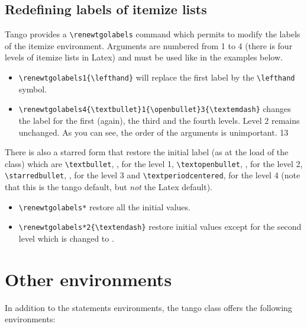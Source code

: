 \documentclass[english,ColorTheme=Red,FontSize=10pt]{tango}
\newcommand\TO[1]{\textsf{#1}}
\begin{document}
\subsection{Redefining labels of itemize lists}
Tango provides a \verb+\renewtgolabels+ command which permits to modify the labels of the \TO{itemize} environment. Arguments are numbered from 1 to 4 (there is four levels of itemize lists in Latex) and must be used like in the examples below.
\begin{example}[Examples]
\begin{itemize}
\item\verb=\renewtgolabels1{\lefthand}= will replace the first label by the \verb=\lefthand= symbol.
\item\verb=\renewtgolabels4{\textbullet}1{\openbullet}3{\textemdash}= changes the label for the first (again), the third and the fourth levels. Level 2 remains unchanged. As you can see, the order of the arguments is unimportant. 1{\openbullet}3{\textemdash}
\end{itemize}
\end{example}

There is also a starred form that restore the initial label (as at the load of the class) which are \verb=\textbullet=, \textbullet, for the level 1, \verb=\textopenbullet=, \textopenbullet,  for the level 2, \verb=\starredbullet=, \starredbullet, for the level 3 and \verb=\textperiodcentered=, \textperiodcentered{} for the level 4 (note that this is the tango default, but \emph{not} the Latex default).

\renewtgolabels*
\begin{example}[Examples]
\begin{itemize}
\item\verb=\renewtgolabels*= restore all the initial values.
\item\verb=\renewtgolabels*2{\textendash}= restore initial values except for the second level which is changed to \textendash.
\end{itemize}
\end{example}


\section{Other environments}
In addition to the statements environments, the tango class offers the following environments:
\end{document}
